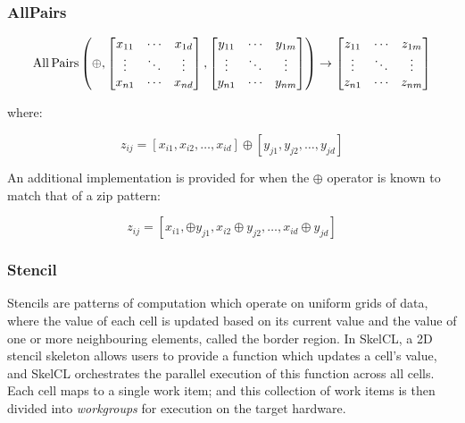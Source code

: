 \subsubsection{AllPairs}

\begin{equation}
\operatorname*{All\,Pairs} \left( \oplus,
\begin{bmatrix}
  x_{11} & \cdots & x_{1d} \\
  \vdots & \ddots & \vdots \\
  x_{n1} & \cdots & x_{nd}
\end{bmatrix},
\begin{bmatrix}
  y_{11} & \cdots & y_{1m} \\
  \vdots & \ddots & \vdots \\
  y_{n1} & \cdots & y_{nm}
\end{bmatrix} \right)
\to
\begin{bmatrix}
  z_{11} & \cdots & z_{1m} \\
  \vdots & \ddots & \vdots \\
  z_{n1} & \cdots & z_{nm}
\end{bmatrix}
\end{equation}

where:

\begin{equation}
z_{ij} =
\left[ x_{i1}, x_{i2}, \ldots, x_{id} \right] \oplus
\left[ y_{j1}, y_{j2}, \ldots, y_{jd} \right]
\end{equation}

An additional implementation is provided for when the $\oplus$
operator is known to match that of a zip pattern:

\begin{equation}
z_{ij} =
\left[
  x_{i1}, \oplus y_{j1}, x_{i2} \oplus y_{j2}, \ldots, x_{id} \oplus y_{jd}
\right]
\end{equation}


\subsubsection{Stencil}


Stencils are patterns of computation which operate on uniform grids of
data, where the value of each cell is updated based on its current
value and the value of one or more neighbouring elements, called the
border region. In SkelCL, a 2D stencil skeleton allows users to
provide a function which updates a cell's value, and SkelCL
orchestrates the parallel execution of this function across all
cells. Each cell maps to a single work item; and this collection of
work items is then divided into \emph{workgroups} for execution on the
target hardware.

